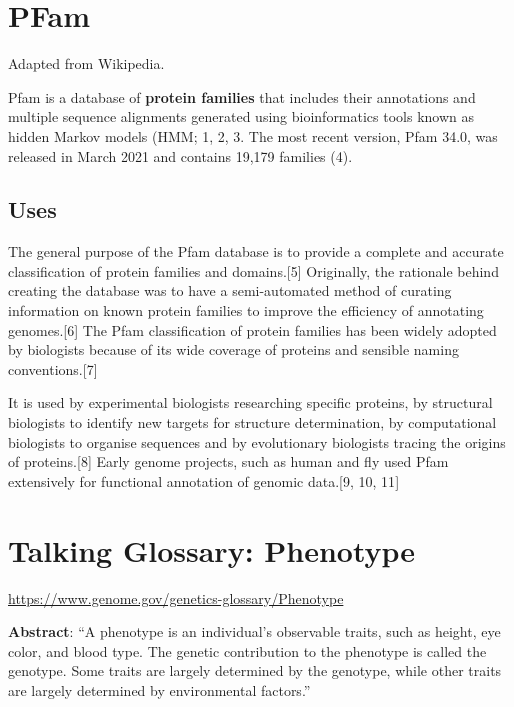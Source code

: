 \documentclass[
]{book}
\begin{document}
\hypertarget{pfam}{%
\section{PFam}\label{pfam}}

Adapted from Wikipedia.

Pfam is a database of \textbf{protein families} that includes their annotations and multiple sequence alignments generated using bioinformatics tools known as hidden Markov models (HMM; 1, 2, 3. The most recent version, Pfam 34.0, was released in March 2021 and contains 19,179 families (4).

\hypertarget{uses}{%
\subsection{Uses}\label{uses}}

The general purpose of the Pfam database is to provide a complete and accurate classification of protein families and domains.{[}5{]} Originally, the rationale behind creating the database was to have a semi-automated method of curating information on known protein families to improve the efficiency of annotating genomes.{[}6{]} The Pfam classification of protein families has been widely adopted by biologists because of its wide coverage of proteins and sensible naming conventions.{[}7{]}

It is used by experimental biologists researching specific proteins, by structural biologists to identify new targets for structure determination, by computational biologists to organise sequences and by evolutionary biologists tracing the origins of proteins.{[}8{]} Early genome projects, such as human and fly used Pfam extensively for functional annotation of genomic data.{[}9, 10, 11{]}

\hypertarget{talking-glossary-phenotype}{%
\section{Talking Glossary: Phenotype}\label{talking-glossary-phenotype}}

\url{https://www.genome.gov/genetics-glossary/Phenotype}

\textbf{Abstract}: ``A phenotype is an individual's observable traits, such as height, eye color, and blood type. The genetic contribution to the phenotype is called the genotype. Some traits are largely determined by the genotype, while other traits are largely determined by environmental factors.''
\end{document}
